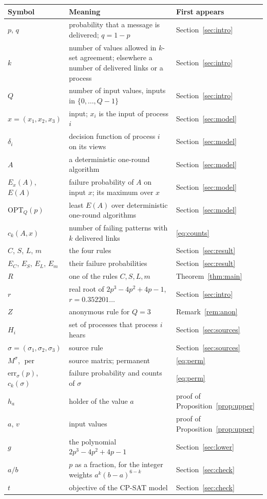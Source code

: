 \documentclass[11pt]{article}
\theoremstyle{remark}
\newcommand{\OPT}{\mathrm{OPT}}
\begin{document}
\begin{center}\begin{tabular}{@{}lp{}l@{}}\toprule
Symbol & Meaning & First appears \\ \midrule
$p$, $q$ & probability that a message is delivered; $q=1-p$ & Section~\ref{sec:intro} \\
$k$ & number of values allowed in $k$-set agreement; elsewhere a number of delivered links or a process & Section~\ref{sec:intro} \\
$Q$ & number of input values, inputs in $\{0,\dots,Q-1\}$ & Section~\ref{sec:intro} \\
$x=(x_1,x_2,x_3)$ & input; $x_i$ is the input of process $i$ & Section~\ref{sec:model} \\
$\delta_i$ & decision function of process $i$ on its views & Section~\ref{sec:model} \\
$A$ & a deterministic one-round algorithm & Section~\ref{sec:model} \\
$E_x(A)$, $E(A)$ & failure probability of $A$ on input $x$; its maximum over $x$ & Section~\ref{sec:model} \\
$\OPT_Q(p)$ & least $E(A)$ over deterministic one-round algorithms & Section~\ref{sec:model} \\
$c_k(A,x)$ & number of failing patterns with $k$ delivered links & \eqref{eq:counts} \\
$C$, $S$, $L$, $m$ & the four rules & Section~\ref{sec:result} \\
$E_C$, $E_S$, $E_L$, $E_m$ & their failure probabilities & Section~\ref{sec:result} \\
$R$ & one of the rules $C,S,L,m$ & Theorem~\ref{thm:main} \\
$r$ & real root of $2p^3-4p^2+4p-1$, $r=0.352201\dots$ & Section~\ref{sec:intro} \\
$Z$ & anonymous rule for $Q=3$ & Remark~\ref{rem:anon} \\
$H_i$ & set of processes that process $i$ hears & Section~\ref{sec:sources} \\
$\sigma=(\sigma_1,\sigma_2,\sigma_3)$ & source rule & Section~\ref{sec:sources} \\
$M^\sigma$, $\operatorname{per}$ & source matrix; permanent & \eqref{eq:perm} \\
$\mathrm{err}_\sigma(p)$, $c_k(\sigma)$ & failure probability and counts of $\sigma$ & \eqref{eq:perm} \\
$h_a$ & holder of the value $a$ & proof of Proposition~\ref{prop:upper} \\
$a$, $v$ & input values & proof of Proposition~\ref{prop:upper} \\
$g$ & the polynomial $2p^3-4p^2+4p-1$ & Section~\ref{sec:lower} \\
$a/b$ & $p$ as a fraction, for the integer weights $a^k(b-a)^{6-k}$ & Section~\ref{sec:check} \\
$t$ & objective of the CP-SAT model & Section~\ref{sec:check} \\
\bottomrule\end{tabular}\end{center}
\end{document}
